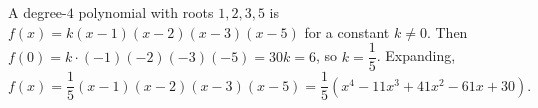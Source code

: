 A degree-$4$ polynomial with roots $1,2,3,5$ is $f(x)=k(x-1)(x-2)(x-3)(x-5)$ for a constant $k\ne0$. Then $f(0)=k\cdot(-1)(-2)(-3)(-5)=30k=6$, so $k=\dfrac{1}{5}$. Expanding,
\[
\boxed{f(x)=\dfrac{1}{5}(x-1)(x-2)(x-3)(x-5)=\dfrac{1}{5}\left(x^4-11x^3+41x^2-61x+30\right)}.
\]
